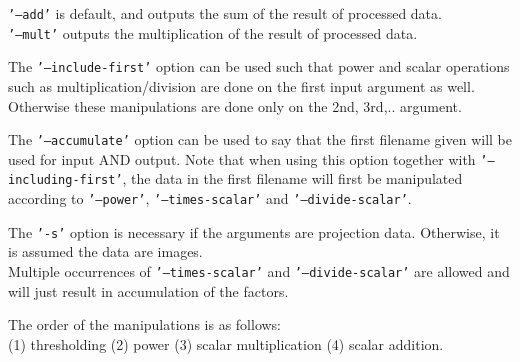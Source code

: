 \documentclass{article}
\begin{document}
\noindent
\texttt{'--add'} is default, and outputs the sum of the result of 
processed data.\\
\texttt{'--mult'} outputs the multiplication of the result of processed 
data.


The \texttt{'--include-first'} option can be used such that power and 
scalar operations such as multiplication/division are done on 
the first input argument as well. Otherwise these manipulations 
are done only on the 2nd, 3rd,.. argument.


The \texttt{'--accumulate'} option can be used to say that the first filename 
given will be used for input AND output. Note that when using 
this option together with \texttt{'--including-first'}, the data in the 
first filename will first be manipulated according to \texttt{'--power'}, 
\texttt{'--times-scalar'} and \texttt{'--divide-scalar'}.


The \texttt{'-s'} option is necessary if the arguments are projection 
data. Otherwise, it is assumed the data are images.\\
Multiple occurrences of \texttt{'--times-scalar'} and \texttt{'--divide-scalar'} 
are allowed and will just result in accumulation of the factors.


The order of the manipulations is as follows:\\
(1) thresholding (2) power (3) scalar multiplication (4) scalar 
addition.\\
\end{document}
